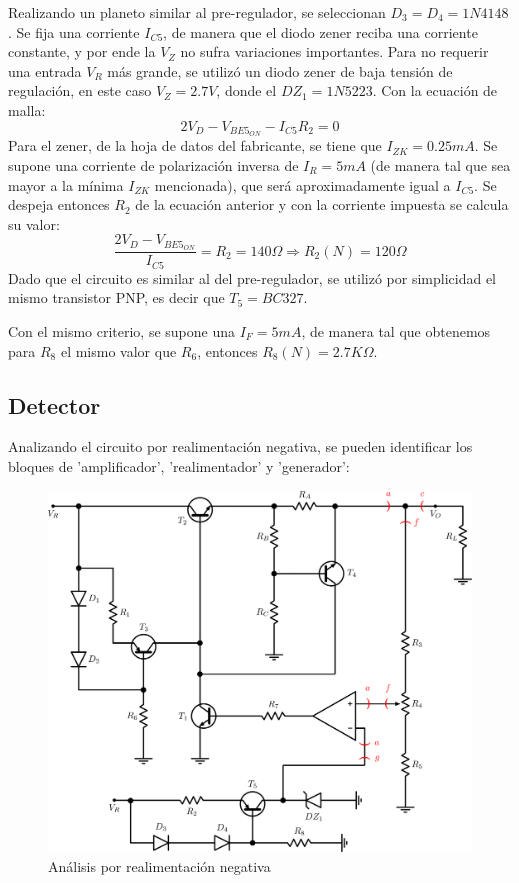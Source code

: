 Realizando un planeto similar al pre-regulador, se seleccionan $D_3 = D_4 = 1N4148$. Se fija una corriente $I_{C5}$, de manera que el diodo zener reciba una corriente constante, y por ende la $V_Z$ no sufra variaciones importantes. Para no requerir una entrada $V_R$ m\'as grande, se utiliz\'o un diodo zener de baja tensi\'on de regulaci\'on, en este caso $V_Z = 2.7V$, donde el $DZ_1 = 1N5223$. Con la ecuaci\'on de malla:
\[
2V_D - V_{BE5_{ON}} - I_{C5}R_2 = 0
\]
Para el zener, de la hoja de datos del fabricante, se tiene que $I_{ZK} = 0.25mA$. Se supone una corriente de polarizaci\'on inversa de $I_R = 5mA$ (de manera tal que sea mayor a la m\'inima $I_{ZK}$ mencionada), que ser\'a aproximadamente igual a $I_{C5}$. Se despeja entonces $R_2$ de la ecuaci\'on anterior y con la corriente impuesta se calcula su valor:
\[
\frac{2V_D - V_{BE5_{ON}}}{I_{C5}} = R_2 = 140\Omega \Longrightarrow R_2(N) = 120\Omega
\]
Dado que el circuito es similar al del pre-regulador, se utiliz\'o por simplicidad el mismo transistor PNP, es decir que $T_5 = BC327$.

Con el mismo criterio, se supone una $I_F = 5mA$, de manera tal que obtenemos para $R_8$ el mismo valor que $R_6$, entonces $R_8(N) = 2.7K\Omega$.

\newpage

\subsection{Detector}

Analizando el circuito por realimentaci\'on negativa, se pueden identificar los bloques de 'amplificador', 'realimentador' y 'generador':

\begin{figure}[!ht]
\begin{centering}
\includegraphics[scale=0.34]{Imagenes/CircuitoConFeed.png}
\par\end{centering}
\caption{An\'alisis por realimentaci\'on negativa}

\end{figure}

